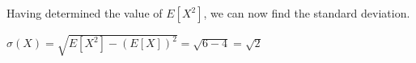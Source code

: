 \documentclass{book}
\begin{document}
\begin{center}
\end{center}

Having determined the value of $E[X^2]$, we can now find the standard deviation.

\begin{center}
$\sigma(X)=   \sqrt{E[X^2 ]- (E[X]) ^ 2}= \sqrt{6- 4} = \sqrt{2}$
\end{center}

\begin{center}
\end{center}
	
\begin{comment}
\textbf{Brain Teasers}
\begin{enumerate}
\item State whether series is convergent $\sum_{n=1}^{\infty} n/2^{n} $
\item State whether the series is convergent $\sum_{n=1}^{\infty} 1/n$ 
\end{enumerate}
\end{comment}




\end{document}
